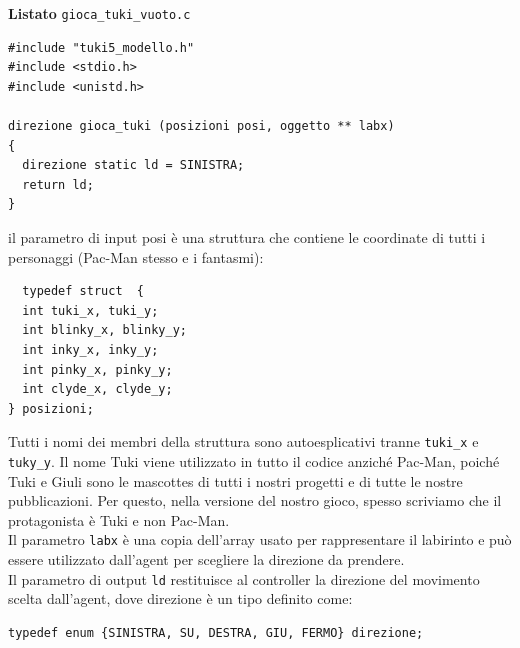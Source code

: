 \documentclass[8pt]{book}
\begin{document}
\textbf{Listato} \texttt{gioca\_tuki\_vuoto.c} \\


  \begin{spacing}{0.9}
    \begin{small}
      \begin{tcolorbox}
\begin{verbatim}
#include "tuki5_modello.h"
#include <stdio.h>
#include <unistd.h>

direzione gioca_tuki (posizioni posi, oggetto ** labx)
{
  direzione static ld = SINISTRA; 
  return ld;
}
\end{verbatim}
\end{tcolorbox}
    \end{small}
  \end{spacing}


il parametro di input posi è una struttura che contiene le coordinate di tutti i personaggi (Pac-Man stesso e i fantasmi):


  \begin{spacing}{0.9}
    \begin{small}
      \begin{tcolorbox}
\begin{verbatim}
  typedef struct  {
  int tuki_x, tuki_y;
  int blinky_x, blinky_y;
  int inky_x, inky_y;
  int pinky_x, pinky_y;
  int clyde_x, clyde_y;
} posizioni;
\end{verbatim}
\end{tcolorbox}
    \end{small}
  \end{spacing}


Tutti i nomi dei membri della struttura sono autoesplicativi tranne \texttt{tuki\_x} e \texttt{tuky\_y}. Il nome Tuki viene utilizzato in tutto il codice anziché Pac-Man, poiché Tuki e Giuli sono le mascottes di tutti i nostri progetti e di tutte le nostre pubblicazioni. Per questo, nella versione del nostro gioco, spesso scriviamo che il protagonista è Tuki e non Pac-Man.\\
Il parametro \texttt{labx} è una copia dell'array usato per rappresentare il labirinto e può essere utilizzato dall'agent per scegliere la direzione da prendere.\\
Il parametro di output \texttt{ld} restituisce al controller la direzione del movimento scelta dall'agent, dove direzione è un tipo definito come:


  \begin{spacing}{0.9}
    \begin{small}
      \begin{tcolorbox}
\begin{verbatim}
typedef enum {SINISTRA, SU, DESTRA, GIU, FERMO} direzione;
\end{verbatim}
\end{tcolorbox}
    \end{small}
  \end{spacing}
\end{document}
